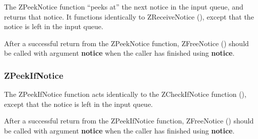 \etemplate
{}

The ZPeekNotice function ``peeks at'' the next notice in the input
queue, and returns that notice.  It functions identically to
ZReceiveNotice (), except that the notice is left
in the input queue.

After a successful return from the ZPeekNotice function,
ZFreeNotice () should be called with argument {\bf
notice} when the caller has finished using {\bf notice}.

\subsubsection{ZPeekIfNotice}
\label{ZPeekIfNotice}

\etemplate
{}

The ZPeekIfNotice function acts identically to the ZCheckIfNotice function
(), except that the notice is left in
the input queue.

After a successful return from the ZPeekIfNotice function,
ZFreeNotice () should be called with argument {\bf
notice} when the caller has finished using {\bf notice}.
